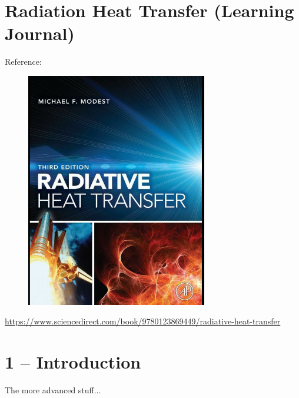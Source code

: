\documentclass[12pt]{article}
\renewcommand{\_}{\kern-1.5pt\textunderscore\kern-1.5pt}
\begin{document}
\section*{Radiation Heat Transfer (Learning Journal)}
Reference:\par




\begin{figure}[H]
	\begin{Center}
		\includegraphics[width=3.11in,height=4.05in]{./media/image1.png}
	\end{Center}
\end{figure}



\par

\href{https://www.sciencedirect.com/book/9780123869449/radiative-heat-transfer}{https://www.sciencedirect.com/book/9780123869449/radiative-heat-transfer}\par

\section*{1 – Introduction}
The more advanced stuff$ \ldots $ \par
\end{document}
